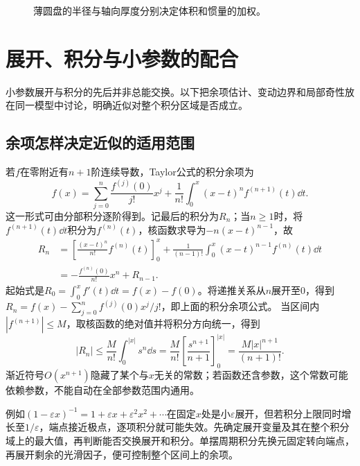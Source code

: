 \begin{solution}
\begin{figure}[H]\centering
{}
\caption{薄圆盘的半径与轴向厚度分别决定体积和惯量的加权。}\label{fig:c1-e8-s}
\end{figure}
\end{solution}

\section{展开、积分与小参数的配合}
小参数展开与积分的先后并非总能交换。以下把余项估计、变动边界和局部奇性放在同一模型中讨论，明确近似对整个积分区域是否成立。

\subsection{余项怎样决定近似的适用范围}
若$f$在零附近有$n+1$阶连续导数，Taylor公式的积分余项为
\[f(x)=\sum_{j=0}^n\frac{f^{(j)}(0)}{j!}x^j+\frac1{n!}\int_0^x(x-t)^nf^{(n+1)}(t)\dd t.
\]
这一形式可由分部积分逐阶得到。记最后的积分为$R_n$；当$n\ge1$时，将$f^{(n+1)}(t)\dd t$积分为$f^{(n)}(t)$，核函数求导为$-n(x-t)^{n-1}$，故
\[
\begin{aligned}
 R_n&=\left[\frac{(x-t)^n}{n!}f^{(n)}(t)\right]_0^x
 +\frac1{(n-1)!}\int_0^x(x-t)^{n-1}f^{(n)}(t)\dd t\\
 &=-\frac{f^{(n)}(0)}{n!}x^n+R_{n-1}.
\end{aligned}
\]
起始式是$R_0=\int_0^xf'(t)\dd t=f(x)-f(0)$。将递推关系从$n$展开至$0$，得到$R_n=f(x)-\sum_{j=0}^nf^{(j)}(0)x^j/j!$，即上面的积分余项公式。
当区间内$|f^{(n+1)}|\le M$，取核函数的绝对值并将积分方向统一，得到
\[|R_n|\le\frac{M}{n!}\int_0^{|x|}s^n\dd s
=\frac{M}{n!}\left[\frac{s^{n+1}}{n+1}\right]_0^{|x|}
=\frac{M|x|^{n+1}}{(n+1)!}.\]
渐近符号$O(x^{n+1})$隐藏了某个与$x$无关的常数；若函数还含参数，这个常数可能依赖参数，不能自动在全部参数范围内通用。

例如$(1-\varepsilon x)^{-1}=1+\varepsilon x+\varepsilon^2x^2+\cdots$在固定$x$处是小$\varepsilon$展开，但若积分上限同时增长至$1/\varepsilon$，端点接近极点，逐项积分就可能失效。先确定展开变量及其在整个积分域上的最大值，再判断能否交换展开和积分。单摆周期积分先换元固定转向端点，再展开剩余的光滑因子，便可控制整个区间上的余项。

